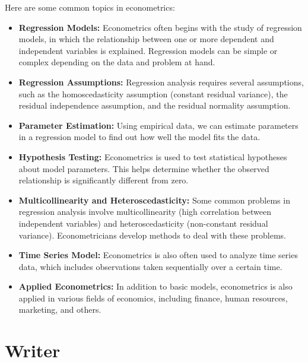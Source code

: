 \documentclass[
]{book}
\begin{document}
Here are some common topics in econometrics:

\begin{itemize}
\item
  \textbf{Regression Models:} Econometrics often begins with the study of regression models, in which the relationship between one or more dependent and independent variables is explained. Regression models can be simple or complex depending on the data and problem at hand.
\item
  \textbf{Regression Assumptions:} Regression analysis requires several assumptions, such as the homoscedasticity assumption (constant residual variance), the residual independence assumption, and the residual normality assumption.
\item
  \textbf{Parameter Estimation:} Using empirical data, we can estimate parameters in a regression model to find out how well the model fits the data.
\item
  \textbf{Hypothesis Testing:} Econometrics is used to test statistical hypotheses about model parameters. This helps determine whether the observed relationship is significantly different from zero.
\item
  \textbf{Multicollinearity and Heteroscedasticity:} Some common problems in regression analysis involve multicollinearity (high correlation between independent variables) and heteroscedasticity (non-constant residual variance). Econometricians develop methods to deal with these problems.
\item
  \textbf{Time Series Model:} Econometrics is also often used to analyze time series data, which includes observations taken sequentially over a certain time.
\item
  \textbf{Applied Econometrics:} In addition to basic models, econometrics is also applied in various fields of economics, including finance, human resources, marketing, and others.
\end{itemize}

\hypertarget{writer}{%
\section*{Writer}\label{writer}}
\end{document}
